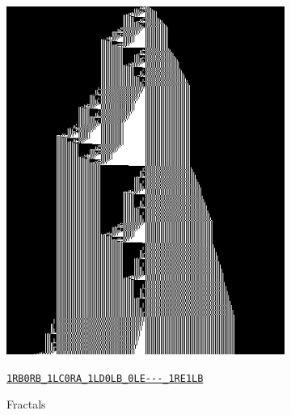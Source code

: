 \documentclass[a4paper,british]{article}
\theoremstyle{definition} %
\numberwithin{equation}{section}
\theoremstyle{definition} %
\newcommand{\tm}[1]{\href{https://bbchallenge.org/#1}{\texttt{\nolinkurl{#1}}}}
\begin{document}
\begin{figure}[htbp]
    \begin{subfigure}{0.3\textwidth}
        \centering
        \includegraphics[width=\linewidth]{figures/zoology/fractals_1RB0RB_1LC0RA_1LD0LB_0LE---_1RE1LB.png}
        \caption*{Fractals}
        {\scriptsize \tm{1RB0RB_1LC0RA_1LD0LB_0LE---_1RE1LB}}
    \end{subfigure}
    \hfill
    \begin{subfigure}{0.3\textwidth}
        \centering

\end{subfigure}
\end{figure}
\end{document}
